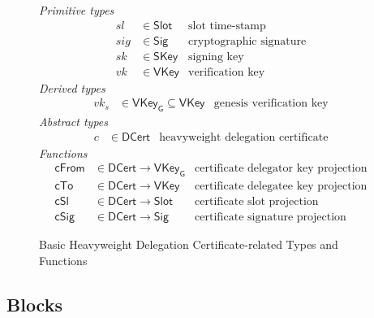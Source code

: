 \documentclass[11pt,a4paper]{article}
\newcommand{\fun}[1]{\mathsf{#1}}
\newcommand{\type}[1]{\mathsf{#1}}
\newcommand{\Slot}{\type{Slot}}
\newcommand{\DCert}{\type{DCert}}
\newcommand{\SKey}{\type{SKey}}
\newcommand{\VKey}{\type{VKey}}
\newcommand{\VKeyGen}{\type{VKey_G}}
\newcommand{\Sig}{\type{Sig}}
\newcommand{\totalf}{\to}
\begin{document}
\begin{figure}
  \emph{Primitive types}
  \begin{align*}
    sl & \in \Slot    & \text{slot time-stamp}\\
   sig & \in \Sig     & \text{cryptographic signature}\\
    sk & \in \SKey    & \text{signing key}\\
    vk & \in \VKey    & \text{verification key}
  \end{align*}
  \emph{Derived types}
  \begin{align*}
    vk_s & \in \VKeyGen \subseteq \VKey & \text{genesis verification key}
  \end{align*}
  \emph{Abstract types}
  \begin{align*}
    c & \in \DCert  & \text{heavyweight delegation certificate}
  \end{align*}
  \emph{Functions}
  \begin{align*}
    \fun{cFrom} & \in \DCert \totalf \VKeyGen & \text{certificate delegator key projection} \\
    \fun{cTo} & \in \DCert \totalf \VKey & \text{certificate delegatee key projection} \\
    \fun{cSl} & \in \DCert \totalf \Slot & \text{certificate slot projection} \\
    \fun{cSig} & \in \DCert \totalf \Sig & \text{certificate signature projection}
  \end{align*}
  \caption{Basic Heavyweight Delegation Certificate-related Types and Functions}
  \label{fig:cert-defs}
\end{figure}


\subsection{Blocks}
\label{sec:blocks}
\end{document}
